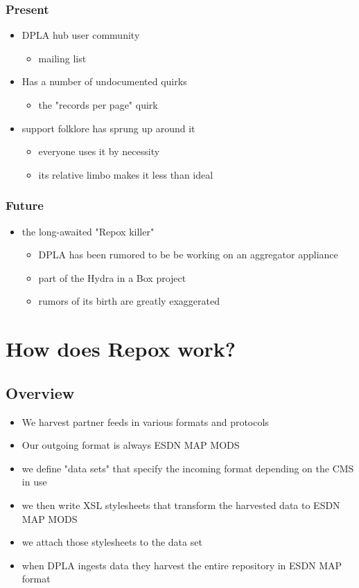 \documentclass[11pt]{article}
\begin{document}
\subsubsection*{Present}
\label{sec:org6d2ac5d}
\begin{itemize}
\item DPLA hub user community
\begin{itemize}
\item mailing list
\end{itemize}
\item Has a number of undocumented quirks
\begin{itemize}
\item the "records per page" quirk
\end{itemize}
\item support folklore has sprung up around it
\begin{itemize}
\item everyone uses it by necessity
\item its relative limbo makes it less than ideal
\end{itemize}
\end{itemize}
\subsubsection*{Future}
\label{sec:org5cfce3d}
\begin{itemize}
\item the long-awaited "Repox killer"
\begin{itemize}
\item DPLA has been rumored to be be working on an aggregator appliance
\item part of the Hydra in a Box project
\item rumors of its birth are greatly exaggerated
\end{itemize}
\end{itemize}

\section*{How does Repox work?}
\label{sec:orgf65f161}
\subsection*{Overview}
\label{sec:org9c65d3e}
\begin{itemize}
\item We harvest partner feeds in various formats and protocols
\item Our outgoing format is always ESDN MAP MODS
\item we define "data sets" that specify the incoming format depending on the CMS in use
\item we then write XSL stylesheets that transform the harvested data to ESDN MAP MODS
\item we attach those stylesheets to the data set
\item when DPLA ingests data they harvest the entire repository in ESDN MAP format
\end{itemize}
\end{document}
